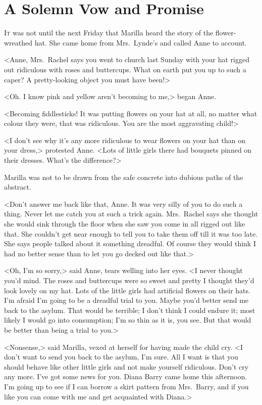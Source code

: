 \chapter{A Solemn Vow and Promise}

\lettrine{I}{t} was not until the next Friday that Marilla heard the story of the flower-wreathed hat. She came home from Mrs.~Lynde's and called Anne to account.

\zz
<Anne, Mrs.~Rachel says you went to church last Sunday with your hat rigged out ridiculous with roses and buttercups. What on earth put you up to such a caper? A pretty-looking object you must have been!>

<Oh. I know pink and yellow aren't becoming to me,> began Anne.

<Becoming fiddlesticks! It was putting flowers on your hat at all, no matter what colour they were, that was ridiculous. You are the most aggravating child!>

<I don't see why it's any more ridiculous to wear flowers on your hat than on your dress,> protested Anne. <Lots of little girls there had bouquets pinned on their dresses. What's the difference?>

Marilla was not to be drawn from the safe concrete into dubious paths of the abstract.

<Don't answer me back like that, Anne. It was very silly of you to do such a thing. Never let me catch you at such a trick again. Mrs.~Rachel says she thought she would sink through the floor when she saw you come in all rigged out like that. She couldn't get near enough to tell you to take them off till it was too late. She says people talked about it something dreadful. Of course they would think I had no better sense than to let you go decked out like that.>

<Oh, I'm so sorry,> said Anne, tears welling into her eyes. <I never thought you'd mind. The roses and buttercups were so sweet and pretty I thought they'd look lovely on my hat. Lots of the little girls had artificial flowers on their hats. I'm afraid I'm going to be a dreadful trial to you. Maybe you'd better send me back to the asylum. That would be terrible; I don't think I could endure it; most likely I would go into consumption; I'm so thin as it is, you see. But that would be better than being a trial to you.>

<Nonsense,> said Marilla, vexed at herself for having made the child cry. <I don't want to send you back to the asylum, I'm sure. All I want is that you should behave like other little girls and not make yourself ridiculous. Don't cry any more. I've got some news for you. Diana Barry came home this afternoon. I'm going up to see if I can borrow a skirt pattern from Mrs.~Barry, and if you like you can come with me and get acquainted with Diana.>

